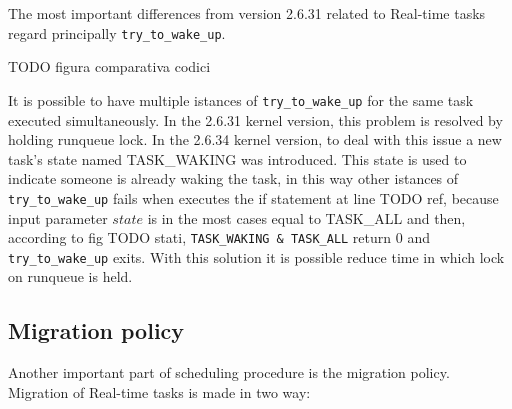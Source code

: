 The most important differences from version 2.6.31 related to Real-time tasks regard principally \texttt{try\_to\_wake\_up}. 

TODO figura comparativa codici

It is possible to have multiple istances of \texttt{try\_to\_wake\_up} for the same task executed simultaneously. In the 2.6.31 kernel version, this problem
is resolved by holding runqueue lock. In the 2.6.34 kernel version, to deal with this issue a new task's state named TASK\_WAKING was introduced. This state
is used to indicate someone is already waking the task, in this way other istances of \texttt{try\_to\_wake\_up} fails when executes the if statement at 
line TODO ref, because input parameter $state$ is in the most cases equal to TASK\_ALL and then, according to fig TODO stati,
\texttt{TASK\_WAKING & TASK\_ALL} return 0 and \texttt{try\_to\_wake\_up} exits. With this solution it is possible reduce time in which lock on runqueue is 
held. 


\subsection{Migration policy}

Another important part of scheduling procedure is the migration policy. Migration of Real-time tasks is made in two way: 

